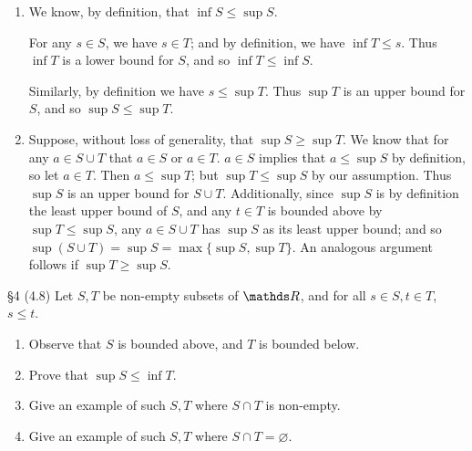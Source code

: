\documentclass{homework}
\begin{document}
\begin{solution}
  \begin{enumerate}[label=(\alph*)]
    \item We know, by definition, that $\inf{S}\le \sup{S}$.

      For any $s \in S$, we have $s \in T$; and by definition, we have $ \inf{T}\le s$. Thus
      $\inf{T}$ is a lower bound for $S$, and so $\inf{T}\le \inf{S}$.

      Similarly, by definition we have $s\le \sup{T}$. Thus $\sup{T}$ is an upper bound for $S$, and
      so $\sup{S}\le \sup{T}$.

    \item Suppose, without loss of generality, that $\sup{S}\ge \sup{T}$. We know that for any $a\in
      S\cup T$ that $a\in S$ or $a\in T$. $a\in S$ implies that $a\le \sup{S}$ by definition, so let
      $a\in T$. Then $a\le \sup{T}$; but $\sup{T}\le \sup{S}$ by our assumption. Thus $\sup{S}$ is
      an upper bound for $S\cup T$. Additionally, since $\sup{S}$ is by definition the least upper
      bound of $S$, and any $t\in T$ is bounded above by $\sup{T}\le \sup{S}$, any $a\in S\cup T$
      has $\sup{S}$ as its least upper bound; and so $\sup{(S\cup T)}=\sup{S}=\max\{ \sup{S},\sup{T}
      \}$. An analogous argument follows if $\sup{T}\ge \sup{S}$.
  \end{enumerate}
\end{solution}

\begin{problem}{\S 4}
  (4.8) Let $S,T$ be non-empty subsets of $\R$, and for all $s \in S, t\in T$, $s\le t$.
  \begin{enumerate}[label=(\alph*)]
    \item Observe that $S$ is bounded above, and $T$ is bounded below.
    \item Prove that $\sup{S}\le \inf{T}$.
    \item Give an example of such $S,T$ where $S\cap T$ is non-empty.
    \item Give an example of such $S,T$ where $S\cap T=\varnothing$.
  \end{enumerate}
\end{problem}
\end{document}
